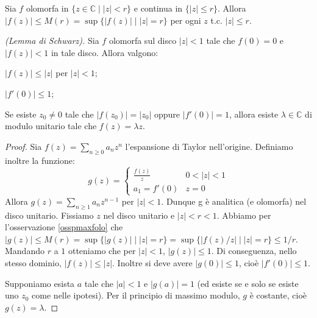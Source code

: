 \begin{oss} \label{osspmaxfolo}
  Sia $f$ olomorfa in $\{z \in \mathbb{C} \mid |z| <r\}$ e continua in $\{|z| \le r\}$. Allora $|f(z)| \le M(r)=\sup\{|f(z)| \mid |z|=r\}$ per ogni $z$ t.c. $|z| \le r$.
\end{oss}

\begin{thm} \emph{(Lemma di Schwarz).}
    Sia $f$ olomorfa sul disco $|z|<1$ tale che $f(0)=0$ e $|f(z)|<1$ in tale
    disco. Allora valgono:
    \begin{nlist}
        \item $|f(z)|\leq |z|$ per $|z|<1$;
        \item $|f'(0)| \le 1$;
        \item Se esiste $z_0\neq 0$ tale che $|f(z_0)|=|z_0|$ oppure
            $|f'(0)|=1$, allora esiste $\lambda\in\mathbb{C}$ di modulo unitario
            tale che $f(z)=\lambda z$.
    \end{nlist}
\end{thm}
\begin{proof}
    Sia $f(z)=\sum_{n\geq 0} a_n z^n$ l'espansione di Taylor nell'origine.
    Definiamo inoltre la funzione:
    \[
        g(z)=
        \begin{cases}
            \frac{f(z)}{z} & 0<|z|<1 \\
            a_1=f'(0) & z=0
        \end{cases}
    \]
    Allora $g(z)=\sum_{n\geq 1}a_n z^{n-1}$ per $|z|<1$. Dunque g \`e analitica
    (e olomorfa) nel disco unitario. Fissiamo $z$ nel disco unitario e $|z|<r<1$. Abbiamo per l'osservazione \ref{osspmaxfolo} che $|g(z)| \le M(r)=\sup\{|g(z)| \mid |z|=r\}=\sup\{|f(z)/z| \mid |z|=r\} \leq 1/r$. Mandando $r$ a $1$ otteniamo che per $|z|<1$, $|g(z)|\leq 1$. Di
    conseguenza, nello stesso dominio, $|f(z)|\leq |z|$. Inoltre si deve avere
    $|g(0)|\leq 1$, cio\`e $|f'(0)|\leq 1$.

    Supponiamo esista $a$ tale che $|a|<1$ e $|g(a)|=1$ (ed esiste se e solo se
    esiste uno $z_0$ come nelle ipotesi). Per il principio di massimo modulo,
    $g$ \`e costante, cio\`e $g(z) = \lambda$.
\end{proof}
